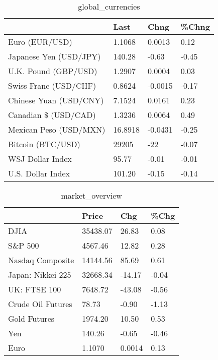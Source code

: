 \documentclass{article}%
\begin{document}
%


\begin{table}[htbp]%
\caption{global\_currencies}%
\centering%
\begin{adjustbox}{width=1\textwidth}%
\begin{tabular}{llll}
\toprule
                       &    Last &    Chng & \%Chng \\
\midrule
        Euro (EUR/USD) &  1.1068 &  0.0013 &  0.12 \\
Japanese Yen (USD/JPY) &  140.28 &   -0.63 & -0.45 \\
  U.K. Pound (GBP/USD) &  1.2907 &  0.0004 &  0.03 \\
 Swiss Franc (USD/CHF) &  0.8624 & -0.0015 & -0.17 \\
Chinese Yuan (USD/CNY) &  7.1524 &  0.0161 &  0.23 \\
  Canadian \$ (USD/CAD) &  1.3236 &  0.0064 &  0.49 \\
Mexican Peso (USD/MXN) & 16.8918 & -0.0431 & -0.25 \\
     Bitcoin (BTC/USD) &   29205 &     -22 & -0.07 \\
      WSJ Dollar Index &   95.77 &   -0.01 & -0.01 \\
     U.S. Dollar Index &  101.20 &   -0.15 & -0.14 \\
\bottomrule
\end{tabular}
%
\end{adjustbox}%
\end{table}

%


\begin{table}[htbp]%
\caption{market\_overview}%
\centering%
\begin{adjustbox}{width=1\textwidth}%
\begin{tabular}{llll}
\toprule
                  &    Price &    Chg &  \%Chg \\
\midrule
             DJIA & 35438.07 &  26.83 &  0.08 \\
          S\&P 500 &  4567.46 &  12.82 &  0.28 \\
 Nasdaq Composite & 14144.56 &  85.69 &  0.61 \\
Japan: Nikkei 225 & 32668.34 & -14.17 & -0.04 \\
     UK: FTSE 100 &  7648.72 & -43.08 & -0.56 \\
Crude Oil Futures &    78.73 &  -0.90 & -1.13 \\
     Gold Futures &  1974.20 &  10.50 &  0.53 \\
              Yen &   140.26 &  -0.65 & -0.46 \\
             Euro &   1.1070 & 0.0014 &  0.13 \\
\bottomrule
\end{tabular}
%
\end{adjustbox}%
\end{table}

%
\end{document}
